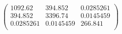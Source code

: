 \documentclass{article}
\begin{document}
\[\left(
\begin{array}{ccc}
 1092.62 & 394.852 & 0.0285261 \\
 394.852 & 3396.74 & 0.0145459 \\
 0.0285261 & 0.0145459 & 266.841 \\
\end{array}
\right)\]
\end{document}
